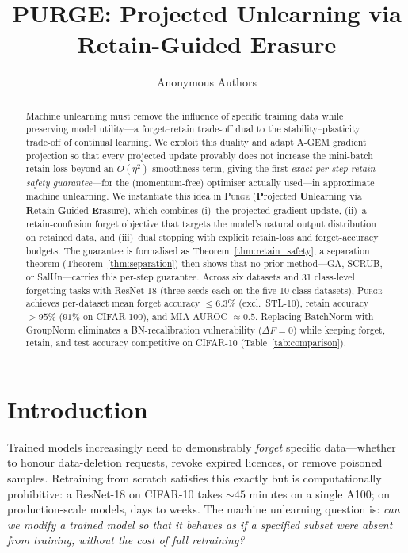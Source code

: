 \documentclass[letterpaper]{article} %
\title{PURGE: Projected Unlearning via Retain-Guided Erasure}
\author{
    Anonymous Authors
}
\newcommand{\ours}{\textsc{Purge}}
\begin{document}
\maketitle

\begin{abstract}
Machine unlearning must remove the influence of specific training data while preserving model utility---a forget--retain trade-off dual to the stability--plasticity trade-off of continual learning.
We exploit this duality and adapt A-GEM gradient projection so that every projected update provably does not increase the mini-batch retain loss beyond an $O(\eta^2)$ smoothness term, giving the first \emph{exact per-step retain-safety guarantee}---for the (momentum-free) optimiser actually used---in approximate machine unlearning.
We instantiate this idea in \ours{} (\textbf{P}rojected \textbf{U}nlearning via \textbf{R}etain-\textbf{G}uided \textbf{E}rasure), which combines (i)~the projected gradient update, (ii)~a retain-confusion forget objective that targets the model's natural output distribution on retained data, and (iii)~dual stopping with explicit retain-loss and forget-accuracy budgets.
The guarantee is formalised as Theorem~\ref{thm:retain_safety}; a separation theorem (Theorem~\ref{thm:separation}) then shows that no prior method---GA, SCRUB, or SalUn---carries this per-step guarantee.
Across six datasets and 31 class-level forgetting tasks with ResNet-18 (three seeds each on the five 10-class datasets), \ours{} achieves per-dataset mean forget accuracy $\le 6.3$\% (excl.\ STL-10), retain accuracy $> 95$\% ($91$\% on CIFAR-100), and MIA AUROC $\approx 0.5$.
Replacing BatchNorm with GroupNorm eliminates a BN-recalibration vulnerability ($\Delta F = 0$) while keeping forget, retain, and test accuracy competitive on CIFAR-10 (Table~\ref{tab:comparison}).
\end{abstract}

\section{Introduction}\label{sec:intro}

Trained models increasingly need to demonstrably \emph{forget} specific data---whether to honour data-deletion requests, revoke expired licences, or remove poisoned samples.
Retraining from scratch satisfies this exactly but is computationally prohibitive: a ResNet-18 on CIFAR-10 takes ${\sim}45$ minutes on a single A100; on production-scale models, days to weeks.
The machine unlearning question is: \emph{can we modify a trained model so that it behaves as if a specified subset were absent from training, without the cost of full retraining?}
\end{document}
